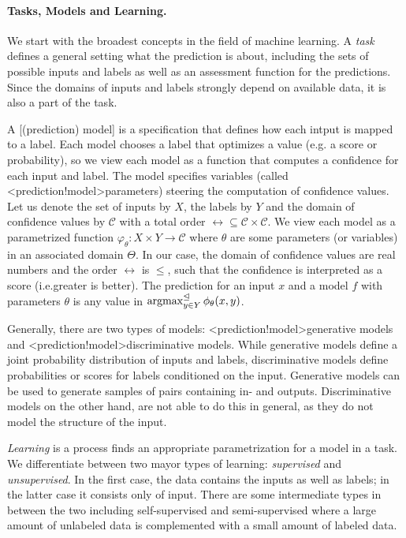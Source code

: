 \documentclass[../document.tex]{subfiles}
\begin{document}
    \paragraph{Tasks, Models and Learning.}
    We start with the broadest concepts in the field of machine learning.
    A \emph{task} defines a general setting what the prediction is about, including the sets of possible inputs and labels as well as an assessment function for the predictions.
    Since the domains of inputs and labels strongly depend on available data, it is also a part of the task.

    A [(prediction) model] is a specification that defines how each intput is mapped to a label.
    Each model chooses a label that optimizes a  value (e.g. a score or probability), so we view each model as a function that computes a confidence for each input and label.
    The model specifies variables (called <prediction!model>{parameters}) steering the computation of confidence values.
    Let us denote the set of inputs by \(X\), the labels by \(Y\) and the domain of confidence values by \(\mathcal{C}\) with a total order \(\rel \subseteq \mathcal{C} \times \mathcal{C}\).
    We view each model as a parametrized function \(\varphi_\theta\colon X \times Y \to \mathcal{C}\) where \(\theta\) are some parameters (or variables) in an associated domain \(\Theta\).
    In our case, the domain of confidence values are real numbers and the order \(\rel\) is \(\leq\), such that the confidence is interpreted as a score (i.e.\@ greater is better).
    The prediction for an input \(x\) and a model \(f\) with parameters \(\theta\) is any value in \(\operatorname{arg max}^{\mathrel{\unlhd}}_{y \in Y} \phi_\theta(x, y)\).

    Generally, there are two types of models: <prediction!model>{generative models} and <prediction!model>{discriminative models}.
    While generative models define a joint probability distribution of inputs and labels, discriminative models define probabilities or scores for labels conditioned on the input.
    Generative models can be used to generate samples of pairs containing in- and outputs.
    Discriminative models on the other hand, are not able to do this in general, as they do not model the structure of the input.

    \emph{Learning} is a process finds an appropriate parametrization for a model in a task.
    We differentiate between two mayor types of learning: \emph{supervised} and \emph{unsupervised}.
    In the first case, the data contains the inputs as well as labels; in the latter case it consists only of input.
    There are some intermediate types in between the two including self-supervised and semi-supervised where a large amount of unlabeled data is complemented with a small amount of labeled data.
\end{document}
